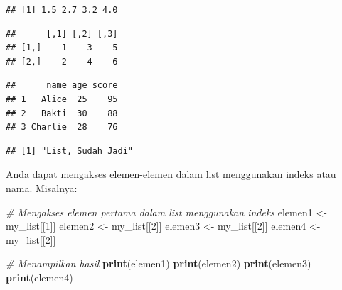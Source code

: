 \documentclass[
]{book}
\newenvironment{Shaded}{\begin{snugshade}}{\end{snugshade}}
\newcommand{\CommentTok}[1]{\textcolor[rgb]{0.56,0.35,0.01}{\textit{#1}}}
\newcommand{\DecValTok}[1]{\textcolor[rgb]{0.00,0.00,0.81}{#1}}
\newcommand{\FunctionTok}[1]{\textcolor[rgb]{0.13,0.29,0.53}{\textbf{#1}}}
\newcommand{\NormalTok}[1]{#1}
\newcommand{\OtherTok}[1]{\textcolor[rgb]{0.56,0.35,0.01}{#1}}
\newcommand{\SpecialCharTok}[1]{\textcolor[rgb]{0.81,0.36,0.00}{\textbf{#1}}}
\begin{document}
\begin{verbatim}
## [1] 1.5 2.7 3.2 4.0
\end{verbatim}

\begin{Shaded}
\end{Shaded}

\begin{verbatim}
##      [,1] [,2] [,3]
## [1,]    1    3    5
## [2,]    2    4    6
\end{verbatim}

\begin{Shaded}
\end{Shaded}

\begin{verbatim}
##      name age score
## 1   Alice  25    95
## 2   Bakti  30    88
## 3 Charlie  28    76
\end{verbatim}

\begin{Shaded}
\end{Shaded}

\begin{verbatim}
## [1] "List, Sudah Jadi"
\end{verbatim}

Anda dapat mengakses elemen-elemen dalam list menggunakan indeks atau nama. Misalnya:

\begin{Shaded}
\begin{Highlighting}[]
\CommentTok{\# Mengakses elemen pertama dalam list menggunakan indeks}
\NormalTok{elemen1 }\OtherTok{\textless{}{-}}\NormalTok{ my\_list[[}\DecValTok{1}\NormalTok{]]}
\NormalTok{elemen2 }\OtherTok{\textless{}{-}}\NormalTok{ my\_list[[}\DecValTok{2}\NormalTok{]]}
\NormalTok{elemen3 }\OtherTok{\textless{}{-}}\NormalTok{ my\_list[[}\DecValTok{2}\NormalTok{]]}
\NormalTok{elemen4 }\OtherTok{\textless{}{-}}\NormalTok{ my\_list[[}\DecValTok{2}\NormalTok{]]}

\CommentTok{\# Menampilkan hasil}
\FunctionTok{print}\NormalTok{(elemen1)}
\FunctionTok{print}\NormalTok{(elemen2)}
\FunctionTok{print}\NormalTok{(elemen3)}
\FunctionTok{print}\NormalTok{(elemen4)}
\end{Highlighting}
\end{Shaded}
\end{document}
